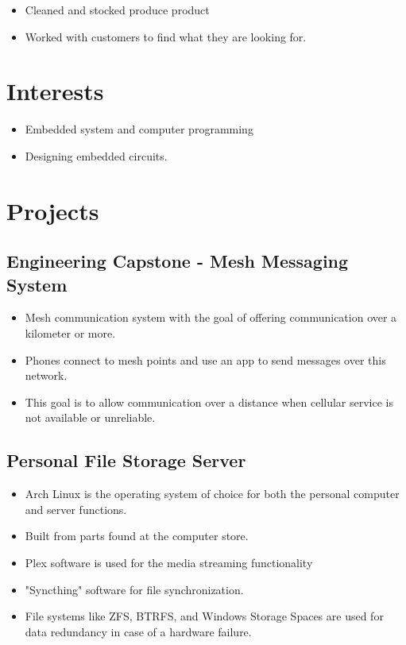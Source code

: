 \documentclass{lsanche_cv}
\begin{document}
\begin{multicols*}{2}
    \begin{itemize}
      \item Cleaned and stocked produce product
      \item Worked with customers to find what they are looking for.
    \end{itemize}
    
  \section{Interests}
    \begin{itemize}
      \item Embedded system and computer programming
      \item Designing embedded circuits.
    \end{itemize}

    \section{Projects}

    \subsection{Engineering Capstone - Mesh Messaging System}
      \begin{itemize}
        \item Mesh communication system with the goal of offering communication over a kilometer or more. 
        \item Phones connect to mesh points and use an app to send messages over this network.
        \item This goal is to allow communication over a distance when cellular service is not available or unreliable.
      \end{itemize}

    \subsection{Personal File Storage Server}
      \begin{itemize}
        \item Arch Linux is the operating system of choice for both the personal computer and server functions.
        \item Built from parts found at the computer store.
        \item Plex software is used for the media streaming functionality
        \item "Syncthing" software for file synchronization.
        \item File systems like ZFS, BTRFS, and Windows Storage Spaces are used for data redundancy in case of a hardware failure.
      \end{itemize}


\end{multicols*}
\end{document}
